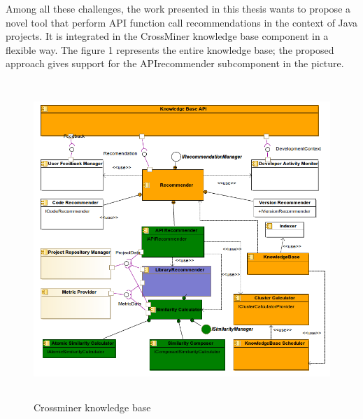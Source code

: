 Among all these challenges, the work presented in this thesis wants to propose a novel tool that perform API function call recommendations in the context of Java projects. It is integrated in the CrossMiner knowledge base component in a flexible way. The figure 1 represents the entire knowledge base; the proposed approach gives support for the APIrecommender subcomponent in the picture.

\begin{figure}[!h]
\includegraphics[width=12cm,height=12cm,keepaspectratio]{images/Kb.png}
\centering
\caption{Crossminer knowledge base}
\label{fig:cmd}
\end{figure}

